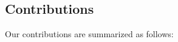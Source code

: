 \documentclass[journal]{IEEEtran}
\begin{document}


\subsection{Contributions}

Our contributions are summarized as follows:
\end{document}
